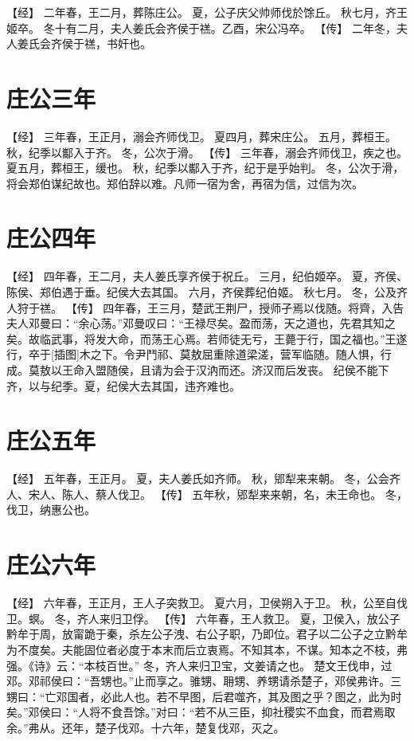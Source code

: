 \documentclass[a4paper,12pt,UTF8,twoside]{ctexbook}
\begin{document}
【经】
二年春，王二月，葬陈庄公。
夏，公子庆父帅师伐於馀丘。
秋七月，齐王姬卒。
冬十有二月，夫人姜氏会齐侯于禚。乙酉，宋公冯卒。
【传】
二年冬，夫人姜氏会齐侯于禚，书奸也。

\chapter{庄公三年}

【经】
三年春，王正月，溺会齐师伐卫。
夏四月，葬宋庄公。
五月，葬桓王。
秋，纪季以酅入于齐。
冬，公次于滑。
【传】
三年春，溺会齐师伐卫，疾之也。
夏五月，葬桓王，缓也。
秋，纪季以酅入于齐，纪于是乎始判。
冬，公次于滑，将会郑伯谋纪故也。郑伯辞以难。凡师一宿为舍，再宿为信，过信为次。

\chapter{庄公四年}

【经】
四年春，王二月，夫人姜氏享齐侯于祝丘。
三月，纪伯姬卒。
夏，齐侯、陈侯、郑伯遇于垂。纪侯大去其国。
六月，齐侯葬纪伯姬。
秋七月。
冬，公及齐人狩于禚。
【传】
四年春，王三月，楚武王荆尸，授师孑焉以伐随。将齊，入告夫人邓曼曰：“余心荡。”邓曼叹曰：“王禄尽矣。盈而荡，天之道也，先君其知之矣。故临武事，将发大命，而荡王心焉。若师徒无亏，王薨于行，国之福也。”王遂行，卒于[插图]木之下。令尹鬥祁、莫敖屈重除道梁溠，营军临随。随人惧，行成。莫敖以王命入盟随侯，且请为会于汉汭而还。济汉而后发丧。
纪侯不能下齐，以与纪季。夏，纪侯大去其国，违齐难也。

\chapter{庄公五年}

【经】
五年春，王正月。
夏，夫人姜氏如齐师。
秋，郳犁来来朝。
冬，公会齐人、宋人、陈人、蔡人伐卫。
【传】
五年秋，郳犁来来朝，名，未王命也。
冬，伐卫，纳惠公也。

\chapter{庄公六年}

【经】
六年春，王正月，王人子突救卫。
夏六月，卫侯朔入于卫。
秋，公至自伐卫。螟。
冬，齐人来归卫俘。
【传】
六年春，王人救卫。
夏，卫侯入，放公子黔牟于周，放甯跪于秦，杀左公子洩、右公子职，乃即位。君子以二公子之立黔牟为不度矣。夫能固位者必度于本末而后立衷焉。不知其本，不谋。知本之不枝，弗强。《诗》云：“本枝百世。”
冬，齐人来归卫宝，文姜请之也。
楚文王伐申，过邓。邓祁侯曰：“吾甥也。”止而享之。骓甥、耼甥、养甥请杀楚子，邓侯弗许。三甥曰：“亡邓国者，必此人也。若不早图，后君噬齐，其及图之乎？图之，此为时矣。”邓侯曰：“人将不食吾馀。”对曰：“若不从三臣，抑社稷实不血食，而君焉取余。”弗从。还年，楚子伐邓。十六年，楚复伐邓，灭之。
\end{document}
